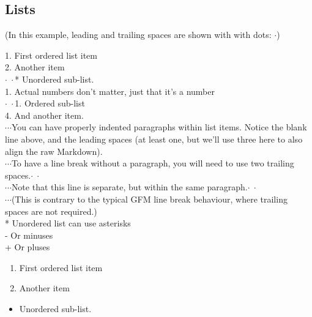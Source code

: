 \subsection{Lists}

(In this example, leading and trailing spaces are shown with with dots: $\cdot$)

\begin{mdframed}
1. First ordered list item \\
2. Another item \\
$\cdot\;\cdot$* Unordered sub-list. \\
1. Actual numbers don't matter, just that it's a number \\
$\cdot\;\cdot$1. Ordered sub-list \\
4. And another item. \\

$\cdots$You can have properly indented paragraphs within list items. Notice the blank line above, and the leading spaces (at least one, but we'll use three here to also align the raw Markdown). \\

$\cdots$To have a line break without a paragraph, you will need to use two trailing spaces.$\cdot\;\cdot$ \\
$\cdots$Note that this line is separate, but within the same paragraph.$\cdot\;\cdot$ \\
$\cdots$(This is contrary to the typical GFM line break behaviour, where trailing spaces are not required.) \\

* Unordered list can use asterisks \\
- Or minuses \\
+ Or pluses
\end{mdframed}

\begin{enumerate}
	\item First ordered list item
	\item Another item
\end{enumerate}

\begin{itemize}[label=\textbullet]
	\item Unordered sub-list.
\end{itemize}

